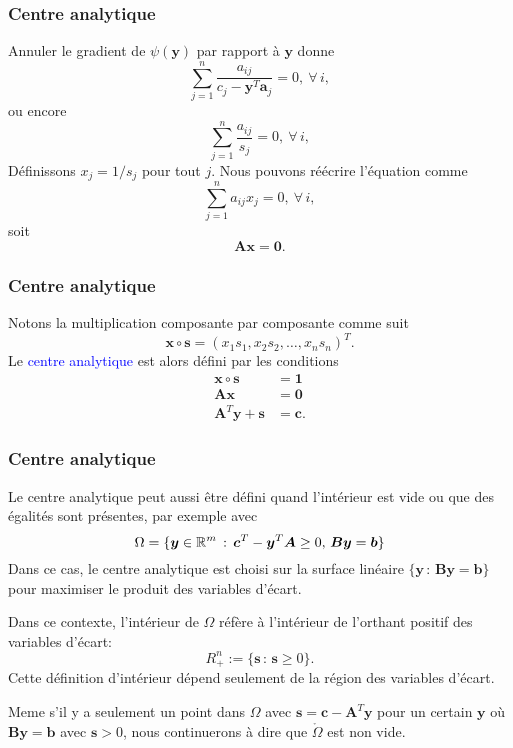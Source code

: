 \documentclass[usepdftitle=false, aspectratio=169]{beamer}
\def\ba{\boldsymbol{a}}
\def\bb{\boldsymbol{b}}
\def\bc{\boldsymbol{c}}
\def\bs{\boldsymbol{s}}
\def\bx{\boldsymbol{x}}
\def\by{\boldsymbol{y}}
\def\bA{\boldsymbol{A}}
\def\bB{\boldsymbol{B}}
\def\bzero{\boldsymbol{0}}
\def\bone{\boldsymbol{1}}
\begin{document}
\begin{frame}
\frametitle{Centre analytique}

Annuler le gradient de $\psi(\by)$ par rapport à $\by$ donne
\[
\sum_{j = 1}^n \frac{a_{ij}}{c_j - \by^T\ba_j} = 0,\ \forall\, i,
\]
ou encore
\[
\sum_{j = 1}^n \frac{a_{ij}}{s_j} = 0,\ \forall\, i,
\]
Définissons $x_j = 1/s_j$ pour tout $j$. Nous pouvons réécrire l'équation comme
$$
\sum_{j = 1}^n a_{ij}x_j = 0,\ \forall\, i,
$$
soit
$$
\bA\bx = \bzero.
$$

\end{frame}

\begin{frame}
\frametitle{Centre analytique}

Notons la multiplication composante par composante comme suit
\[
\bx \circ \bs = (x_1s_1, x_2s_2, \ldots, x_ns_n)^T.
\]
Le \textcolor{blue}{centre analytique} est alors défini par les conditions
\begin{align*}
\bx \circ \bs &= \bone \\
\bA\bx &= \bzero \\
\bA^T\by + \bs & = \bc.
\end{align*}

\end{frame}

\begin{frame}
\frametitle{Centre analytique}

Le centre analytique peut aussi être défini quand l'intérieur est vide ou que des égalités sont présentes, par exemple avec
\[
\Omega = \lbrace \by \in \RR^m \,:\, \bc^T-\by^T\bA \geq 0,\, \bB\by = \bb \rbrace
\]
Dans ce cas, le centre analytique est choisi sur la surface linéaire $\lbrace \by \,:\, \bB\by = \bb \rbrace$ pour maximiser le produit des variables d'écart.

\mbox{}

Dans ce contexte, l'intérieur de $\Omega$ réfère à l'intérieur de l'orthant positif des variables d'écart:
\[
R^n_+ := \lbrace \bs \,:\, \bs \geq 0 \rbrace.
\]
Cette définition d'intérieur dépend seulement de la région des variables d'écart.

\mbox{}

Meme s'il y a seulement un point dans $\Omega$ avec $\bs = \bc - \bA^T\by$ pour un certain $\by$ où $\bB\by = \bb$ avec $\bs > 0$, nous continuerons à dire que $\mathring{\Omega}$ est non vide.

\end{frame}
\end{document}
